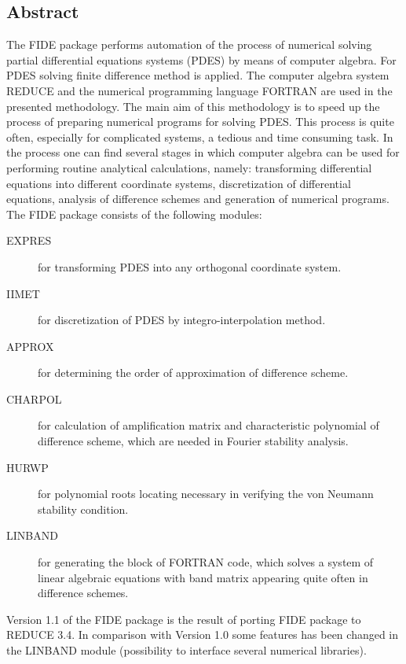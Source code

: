 
\subsection{Abstract}


     The FIDE  package performs  automation of  the process of numerical
solving  partial  differential  equations  systems  (PDES)  by  means of
computer algebra.  For PDES solving finite difference method is applied.
The  computer  algebra  system  REDUCE  and  the  numerical  programming
language FORTRAN  are used in the presented methodology. The main aim of
this methodology is to  speed  up  the  process  of  preparing numerical
programs for  solving PDES.  This process is quite often, especially for
complicated systems, a tedious and time consuming task.
     In the process  one  can  find  several  stages  in  which computer
algebra  can  be  used  for  performing routine analytical calculations,
namely: transforming differential  equations  into  different coordinate
systems,   discretization   of   differential   equations,  analysis  of
difference  schemes  and  generation  of  numerical  programs.  The FIDE
package consists of the following modules:
\begin{description}
  \item[EXPRES]  for transforming PDES into any orthogonal coordinate system.
  \item[IIMET]   for discretization of PDES by integro-interpolation method.
  \item[APPROX]  for determining the order of approximation of difference
          scheme.
  \item[CHARPOL] for calculation of amplification matrix and characteristic
          polynomial of difference scheme, which are needed in Fourier
          stability analysis.
  \item[HURWP]   for polynomial roots locating necessary in verifying the von
          Neumann stability condition.
  \item[LINBAND] for generating the block of FORTRAN code, which solves a
          system of linear algebraic equations with band matrix
          appearing quite often in difference schemes.
\end{description}
     Version  1.1  of  the  FIDE  package  is the result of porting FIDE
package to REDUCE 3.4. In comparison with Version 1.0 some features  has
been changed  in the  LINBAND module  (possibility to  interface several
numerical libraries).




